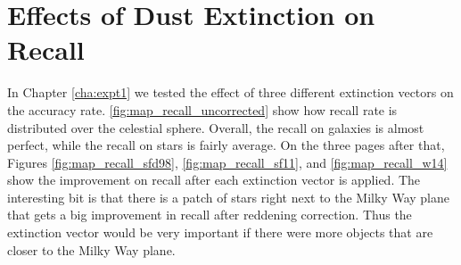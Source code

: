 \section{Effects of Dust Extinction on Recall}

In Chapter \ref{cha:expt1} we tested the effect of three different extinction vectors 
on the accuracy rate. \ref{fig:map_recall_uncorrected} show how recall rate is distributed
over the celestial sphere. Overall, the recall on galaxies is almost perfect, while
the recall on stars is fairly average. On the three pages after that, Figures \ref{fig:map_recall_sfd98}, \ref{fig:map_recall_sf11}, and \ref{fig:map_recall_w14} show
the improvement on recall after each extinction vector is applied. The interesting bit
is that there is a patch of stars right next to the Milky Way plane that gets a big improvement
in recall after reddening correction. Thus the extinction vector would be very important
if there were more objects that are closer to the Milky Way plane.



